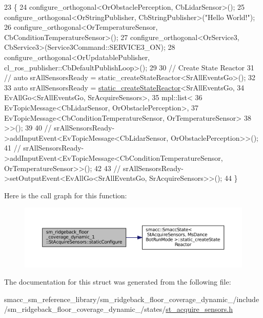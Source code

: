 \begin{DoxyCode}
23    \{
24       configure\_orthogonal<OrObstaclePerception, CbLidarSensor>();
25       configure\_orthogonal<OrStringPublisher, CbStringPublisher>(\textcolor{stringliteral}{"Hello World!"});
26       configure\_orthogonal<OrTemperatureSensor, CbConditionTemperatureSensor>();
27       configure\_orthogonal<OrService3, CbService3>(Service3Command::SERVICE3\_ON);
28       configure\_orthogonal<OrUpdatablePublisher, cl\_ros\_publisher::CbDefaultPublishLoop>();
29 
30       \textcolor{comment}{// Create State Reactor}
31       \textcolor{comment}{// auto srAllSensorsReady = static\_createStateReactor<SrAllEventsGo>();}
32 
33       \textcolor{keyword}{auto} srAllSensorsReady = \hyperlink{classsmacc_1_1SmaccState_a892be704b48f93bf5c35635d1a58ed54}{static\_createStateReactor}<SrAllEventsGo,
34                                                          EvAllGo<SrAllEventsGo, SrAcquireSensors>,
35                                                          mpl::list<
36                                                                EvTopicMessage<CbLidarSensor,
       OrObstaclePerception>,
37                                                                EvTopicMessage<CbConditionTemperatureSensor,
       OrTemperatureSensor>
38                                                             >>();
39 
40       \textcolor{comment}{// srAllSensorsReady->addInputEvent<EvTopicMessage<CbLidarSensor, OrObstaclePerception>>();}
41       \textcolor{comment}{// srAllSensorsReady->addInputEvent<EvTopicMessage<CbConditionTemperatureSensor,
       OrTemperatureSensor>>();}
42 
43       \textcolor{comment}{// srAllSensorsReady->setOutputEvent<EvAllGo<SrAllEventsGo, SrAcquireSensors>>();}
44    \}
\end{DoxyCode}
Here is the call graph for this function\+:
\nopagebreak
\begin{figure}[H]
\begin{center}
\leavevmode
\includegraphics[width=350pt]{structsm__ridgeback__floor__coverage__dynamic__1_1_1StAcquireSensors_a013cc09c170d2a22d3946ed427dd85dc_cgraph}
\end{center}
\end{figure}


The documentation for this struct was generated from the following file\+:\begin{DoxyCompactItemize}
\item 
smacc\+\_\+sm\+\_\+reference\+\_\+library/sm\+\_\+ridgeback\+\_\+floor\+\_\+coverage\+\_\+dynamic\+\_/include/sm\+\_\+ridgeback\+\_\+floor\+\_\+coverage\+\_\+dynamic\+\_/states/\hyperlink{sm__ridgeback__floor__coverage__dynamic__1_2include_2sm__ridgeback__floor__coverage__dynamic__1_df035bf5d633a4b0084571c4e866bf36}{st\+\_\+acquire\+\_\+sensors.\+h}\end{DoxyCompactItemize}
